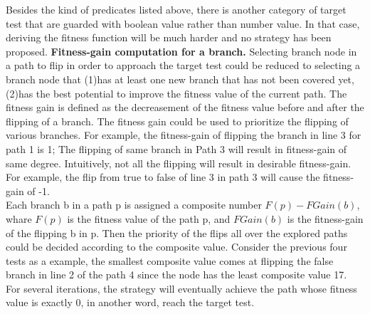 Besides the kind of predicates listed above, there is another category of target test that are guarded with boolean value rather than number value. In that case, deriving the fitness function will be much harder and no strategy has been proposed.
\indent\textbf{Fitness-gain computation for a branch.} Selecting branch node in a path to flip in order to approach the target test could be reduced to selecting a branch node that (1)has at least one new branch that has not been covered yet,(2)has the best potential to improve the fitness value of the current path. The fitness gain is defined as the decreasement of the fitness value before and after the flipping of a branch. The fitness gain could be used to prioritize the flipping of various branches. For example, the fitness-gain of flipping the branch in line 3 for path 1 is 1; The flipping of same branch in Path 3 will result in fitness-gain of same degree. Intuitively, not all the flipping will result in desirable fitness-gain. For example, the flip from true to false of line 3 in path 3 will cause the fitness-gain of -1.\\
\indent Each branch b in a path p is assigned a composite number $F(p)-FGain(b)$, whare $F(p)$ is the fitness value of the path p, and $FGain(b)$ is the fitness-gain of the flipping b in p. Then the priority of the flips all over the explored paths could be decided according to the composite value. Consider the previous four tests as a example, the smallest composite value comes at flipping the false branch in line 2 of the path 4 since the node has the least composite value 17. For several iterations, the strategy will eventually achieve the path whose fitness value is exactly 0, in another word, reach the target test.
